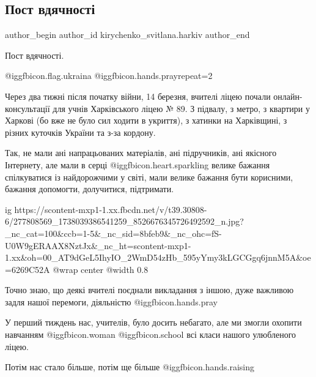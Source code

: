  
 
 
 
 
 
\subsection{Пост вдячності}
\label{sec:10_04_2022.fb.kirychenko_svitlana.harkiv.1.post_vdjachnosti}
 
\ifcmt
 author_begin
   author_id kirychenko_svitlana.harkiv
 author_end
\fi

Пост вдячності.

@igg{fbicon.flag.ukraina} @igg{fbicon.hands.pray}{repeat=2} 

Через два тижні після початку війни, 14 березня, вчителі ліцею почали
онлайн-консультації для учнів Харківського ліцею № 89. З підвалу, з метро, з
квартири у Харкові (бо вже не було сил ходити в укриття), з хатинки на
Харківщині, з різних куточків України та з-за кордону.

Так, не мали ані напрацьованих матеріалів, ані підручників, ані якісного
Інтернету, але мали в серці  @igg{fbicon.heart.sparkling}  велике бажання спілкуватися із найдорожчими у
світі, мали велике бажання бути корисними, бажання допомогти, долучитися,
підтримати.

\ifcmt
  ig https://scontent-mxp1-1.xx.fbcdn.net/v/t39.30808-6/277808569_1738039386541259_8526676345726492592_n.jpg?_nc_cat=100&ccb=1-5&_nc_sid=8bfeb9&_nc_ohc=fS-U0W9gERAAX8NztJx&_nc_ht=scontent-mxp1-1.xx&oh=00_AT9dGeL5IhyIO_2WmD54zHb_595yYmy3kLGCGgq6jnnM5A&oe=6269C52A
  @wrap center
  @width 0.8
\fi

Точно знаю, що деякі вчителі поєднали викладання з іншою, дуже важливою задля
нашої перемоги, діяльністю  @igg{fbicon.hands.pray} 

У перший тиждень нас, учителів, було досить небагато, але ми змогли охопити
навчанням  @igg{fbicon.woman}  @igg{fbicon.school}  всі класи нашого улюбленого ліцею.

Потім нас стало більше, потім ще більше  @igg{fbicon.hands.raising} 

